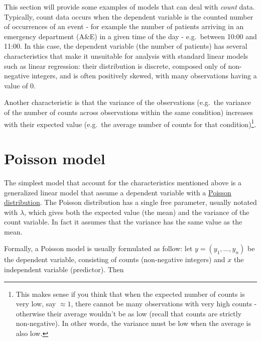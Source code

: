 \documentclass[
]{book}
\begin{document}
This section will provide some examples of models that can deal with \emph{count} data. Typically, count data occurs when the dependent variable is the counted number of occurrences of an event - for example the number of patients arriving in an emergency department (A\&E) in a given time of the day - e.g.~between 10:00 and 11:00. In this case, the dependent variable (the number of patients) has several characteristics that make it unsuitable for analysis with standard linear models such as linear regression: their distribution is discrete, composed only of non-negative integers, and is often positively skewed, with many observations having a value of 0.

Another characteristic is that the variance of the observations (e.g.~the variance of the number of counts across observations within the same condition) increases with their expected value (e.g.~the average number of counts for that condition)\footnote{This makes sense if you think that when the expected number of counts is very low, say \(\approx 1\), there cannot be many observations with very high counts - otherwise their average wouldn't be as low (recall that counts are strictly non-negative). In other words, the variance must be low when the average is also low.}.

\section{Poisson model}\label{poisson-model}

The simplest model that account for the characteristics mentioned above is a generalized linear model that assume a dependent variable with a \href{https://en.wikipedia.org/wiki/Poisson_distribution}{Poisson distribution}. The Poisson distribution has a single free parameter, usually notated with \(\lambda\), which gives both the expected value (the mean) and the variance of the count variable. In fact it assumes that the variance has the same value as the mean.

Formally, a Poisson model is usually formulated as follow: let \(y=(y_1, \dots, y_n)\) be the dependent variable, consisting of counts (non-negative integers) and \(x\) the independent variable (predictor). Then
\end{document}
